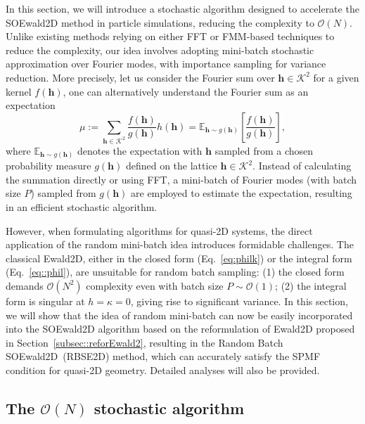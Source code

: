 In this section, we will introduce a stochastic algorithm designed to accelerate the SOEwald2D method in particle simulations, reducing the complexity to $\mathcal{O}(N)$. 
Unlike existing methods relying on either FFT or FMM-based techniques to reduce the complexity, our idea involves adopting mini-batch stochastic approximation over Fourier modes, with importance sampling for variance reduction. 
More precisely, let us consider the Fourier sum over $\bm{h} \in \mathcal{K}^2$ for a given kernel $f(\bm{h})$,
one can alternatively understand the Fourier sum as an expectation
\begin{equation}
	\mu:=\sum_{\bm{h}\in\mathcal{K}^2}\frac{f(\bm{h})}{g(\bm{h})}h(\bm{h})=\mathbb{E}_{\bm h\sim g(\bm{h})}\left[\frac{f(\bm{h})}{g(\bm{h})}\right],
\end{equation}
where $\mathbb{E}_{\bm h \sim g(\bm{h})}$ denotes the expectation with $\bm{h}$ sampled from a chosen probability measure $g(\bm{h})$ defined on the lattice $\bm h \in \mathcal{K}^2$. 
Instead of calculating the summation directly or using FFT, a mini-batch of Fourier modes (with batch size $P$) sampled from $g(\bm{h})$ are employed to estimate the expectation, resulting in an efficient stochastic algorithm.

However, when formulating algorithms for quasi-2D systems, the direct application of the random mini-batch idea introduces formidable challenges.
The classical Ewald2D, either in the closed form (Eq.~\eqref{eq:philk}) or the integral form (Eq.~\eqref{eq::phil}), are unsuitable for random batch sampling:
(1) the closed form demands $\mathcal{O}(N^2)$ complexity even with batch size $P\sim\mathcal O(1)$; 
(2) the integral form is singular at $h = \kappa = 0$, giving rise to significant variance.
In this section, we will show that the idea of random mini-batch can now be easily incorporated into the SOEwald2D algorithm based on the reformulation of Ewald2D proposed in Section~\ref{subsec::reforEwald2}, resulting in the Random Batch SOEwald2D~(RBSE2D) method, which can accurately satisfy the SPMF condition for quasi-2D geometry.
Detailed analyses will also be provided.

\subsection{The $\mathcal{O}(N)$ stochastic algorithm} \label{subsec::rbis}

